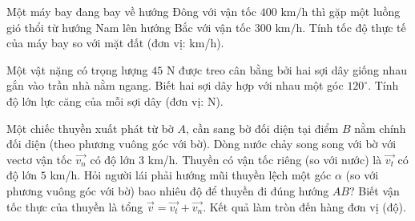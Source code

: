 \begin{bt}%
	Một máy bay đang bay về hướng Đông với vận tốc $400\text{ km/h}$ thì gặp một luồng gió thổi từ hướng Nam lên hướng Bắc với vận tốc $300\text{ km/h}$. Tính tốc độ thực tế của máy bay so với mặt đất (đơn vị: km/h).
\end{bt}

\begin{bt}%
	Một vật nặng có trọng lượng $45\text{ N}$ được treo cân bằng bởi hai sợi dây giống nhau gắn vào trần nhà nằm ngang. Biết hai sợi dây hợp với nhau một góc $120^\circ$. Tính độ lớn lực căng của mỗi sợi dây (đơn vị: N).
\end{bt}

\begin{bt}%
Một chiếc thuyền xuất phát từ bờ $A$, cần sang bờ đối diện tại điểm $B$ nằm chính đối diện (theo phương vuông góc với bờ). Dòng nước chảy song song với bờ với vectơ vận tốc $\overrightarrow{v_n}$ có độ lớn $3$ km/h. Thuyền có vận tốc riêng (so với nước) là $\overrightarrow{v_t}$ có độ lớn $5$ km/h. Hỏi người lái phải hướng mũi thuyền lệch một góc $\alpha$ (so với phương vuông góc với bờ) bao nhiêu độ để thuyền đi đúng hướng $AB$? Biết vận tốc thực của thuyền là tổng $\overrightarrow{v} = \overrightarrow{v_t} + \overrightarrow{v_n}$. Kết quả làm tròn đến hàng đơn vị (độ).

\end{bt}

